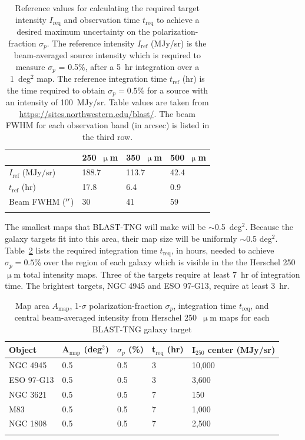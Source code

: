 \begin{table}[!htbp]
\centering
\begin{tabular}{@{}llll@{}}
\dtoprule{}
 & 250~$\upmu$m & 350~$\upmu$m & 500~$\upmu$m \\ \midrule
$I_{\mathrm{ref}}$ ($\mathrm{MJy/sr}$) & 188.7 & 113.7 & 42.4 \\
$t_{\mathrm{ref}}$ ($\mathrm{hr}$) & 17.8 & 6.4 & 0.9 \\
Beam FWHM ($\operatorname{^{\prime\prime}}$) & 30 & 41 & 59 \\ \dbottomrule{}
\\
\end{tabular}
\caption[Reference values for BLAST-TNG mapping calculation.]{Reference values for calculating the required target intensity $I_{\mathrm{req}}$ and observation time $t_{\mathrm{req}}$ to achieve a desired maximum uncertainty on the polarization-fraction $\sigma_{p}$. The reference intensity $I_{\mathrm{ref}}$ (MJy/sr) is the beam-averaged source intensity which is required to measure $\sigma_{p}$ = 0.5\%, after a 5~hr integration over a 1~deg$^{2}$ map. The reference integration time $t_{\mathrm{ref}}$ (hr) is the time required to obtain $\sigma_{p} = 0.5$\% for a source with an intensity of 100~MJy/sr. Table values are taken from \url{https://sites.northwestern.edu/blast/}. The beam FWHM for each observation band (in arcsec) is listed in the third row.}
\label{table:map speed}
\end{table}

The smallest maps that BLAST-TNG will make will be $\sim$0.5~deg$^{2}$. Because the galaxy targets fit into this area, their map size will be uniformly $\sim$0.5 deg$^{2}$. Table~\ref{table:treq} lists the required integration time $t_{\mathrm{req}}$, in hours, needed to achieve $\sigma_{p} = 0.5$\% over the region of each galaxy which is visible in the the Herschel 250~$\upmu$m total intensity maps. Three of the targets require at least 7~hr of integration time. The brightest targets, NGC 4945 and ESO 97-G13, require at least 3~hr.

\begin{table}[!htbp]
\centering
\begin{tabular}{@{}lllll@{}}
\dtoprule{}
Object & A$_{\mathrm{map}}$ (deg$^{2}$) & $\sigma_{p}$ (\%) & t$_{\mathrm{req}}$ (hr) & I$_{250}$ center (MJy/sr) \\ \midrule
NGC 4945 & 0.5 & 0.5 & 3 & 10,000 \\
ESO 97-G13 & 0.5 & 0.5 & 3 & 3,600 \\
NGC 3621 & 0.5 & 0.5 & 7 & 150 \\
M83 & 0.5 & 0.5 & 7 & 1,000 \\
NGC 1808 & 0.5 & 0.5 & 7 & 2,500 \\ \dbottomrule{}
\\
\end{tabular}
\caption[Key mapping parameters for the BLAST-TNG external galaxy targets.]{Map area $A_{\mathrm{map}}$, 1-$\sigma$ polarization-fraction $\sigma_{p}$, integration time $t_{\mathrm{req}}$, and central beam-averaged intensity from Herschel 250~$\upmu$m maps for each BLAST-TNG galaxy target}
\label{table:treq}
\end{table}

